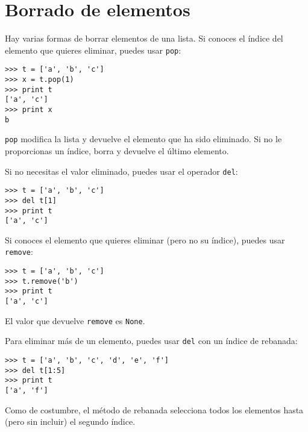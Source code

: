 
\section{Borrado de elementos}


Hay varias formas de borrar elementos de una lista. Si conoces
el índice del elemento que quieres eliminar, puedes usar
{\tt pop}:


\beforeverb
\begin{verbatim}
>>> t = ['a', 'b', 'c']
>>> x = t.pop(1)
>>> print t
['a', 'c']
>>> print x
b
\end{verbatim}
\afterverb
%
{\tt pop} modifica la lista y devuelve el elemento que ha sido eliminado.
Si no le proporcionas un índice, borra y devuelve el
último elemento.

Si no necesitas el valor eliminado, puedes usar el operador
{\tt del}:


\beforeverb
\begin{verbatim}
>>> t = ['a', 'b', 'c']
>>> del t[1]
>>> print t
['a', 'c']
\end{verbatim}
\afterverb
%

Si conoces el elemento que quieres eliminar (pero no su índice), puedes
usar {\tt remove}:


\beforeverb
\begin{verbatim}
>>> t = ['a', 'b', 'c']
>>> t.remove('b')
>>> print t
['a', 'c']
\end{verbatim}
\afterverb
%
El valor que devuelve {\tt remove} es {\tt None}.


Para eliminar más de un elemento, puedes usar {\tt del} con
un índice de rebanada:

\beforeverb
\begin{verbatim}
>>> t = ['a', 'b', 'c', 'd', 'e', 'f']
>>> del t[1:5]
>>> print t
['a', 'f']
\end{verbatim}
\afterverb
%
Como de costumbre, el método de rebanada selecciona todos los elementos hasta (pero
sin incluir) el segundo índice.

